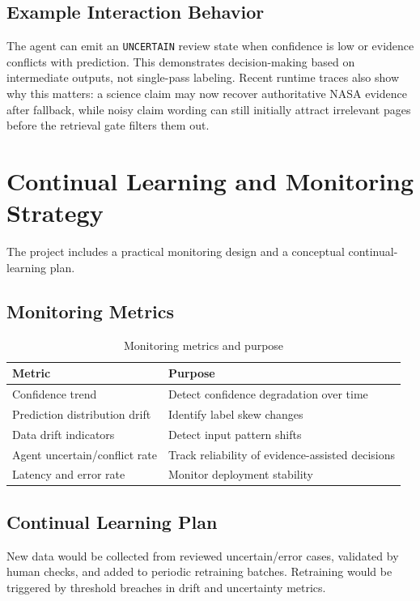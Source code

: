 \documentclass[11pt,a4paper]{article}
\begin{document}
\subsection{Example Interaction Behavior}
The agent can emit an \texttt{UNCERTAIN} review state when confidence is low or evidence conflicts with prediction. This demonstrates decision-making based on intermediate outputs, not single-pass labeling. Recent runtime traces also show why this matters: a science claim may now recover authoritative NASA evidence after fallback, while noisy claim wording can still initially attract irrelevant pages before the retrieval gate filters them out.

\section{Continual Learning and Monitoring Strategy}
The project includes a practical monitoring design and a conceptual continual-learning plan.

\subsection{Monitoring Metrics}
\begin{table}[H]
\centering
\caption{Monitoring metrics and purpose}
\label{tab:monitoring-metrics}
\begin{tabularx}{\textwidth}{lX}
\toprule
Metric & Purpose \\
\midrule
Confidence trend & Detect confidence degradation over time \\
Prediction distribution drift & Identify label skew changes \\
Data drift indicators & Detect input pattern shifts \\
Agent uncertain/conflict rate & Track reliability of evidence-assisted decisions \\
Latency and error rate & Monitor deployment stability \\
\bottomrule
\end{tabularx}
\end{table}

\subsection{Continual Learning Plan}
New data would be collected from reviewed uncertain/error cases, validated by human checks, and added to periodic retraining batches. Retraining would be triggered by threshold breaches in drift and uncertainty metrics.
\end{document}
